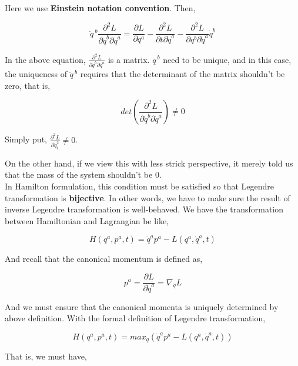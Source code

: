 \documentclass[12pt]{article}
\begin{document}
Here we use \textbf{Einstein notation convention}. Then,

\begin{center}
    \[ \ddot{q}^{\ b} \frac{\partial^2 L}{\partial \dot{q}^b \partial \dot{q}^a} = \frac{\partial L}{\partial q^a} - \frac{\partial^2 L}{\partial t \partial \dot{q}^a} - \frac{\partial^2 L}{\partial q^b \partial \dot{q}^a} \dot{q}^b \]
\end{center}

In the above equation, $\frac{\partial^2 L}{\partial \dot{q}^b \partial \dot{q}^a}$ is a matrix. $\ddot{q}^{\ b}$ need to be unique, and in this case, the uniqueness of $\ddot{q}^{\ b}$ requires that the determinant of the matrix shouldn't be zero, that is,

\begin{center}
    \[ det\left(\frac{\partial^2 L}{\partial \dot{q}^b \partial \dot{q}^a}\right) \ne 0\]
\end{center}

Simply put, $\frac{\partial^2 L}{\partial \dot{q}_i^2} \ne 0$.

On the other hand, if we view this with less strick perspective, it merely told us that the mass of the system shouldn't be $0$.
\\
\indent In Hamilton formulation, this condition must be satisfied so that Legendre transformation is \textbf{bijective}. In other words, we have to make sure the result of inverse Legendre transformation is well-behaved. We have the transformation between Hamiltonian and Lagrangian be like,

\begin{center}
    \[ H(q^a, p^a, t) = \dot{q}^ap^a - L(q^a, \dot{q}^a, t) \]
\end{center}

And recall that the canonical momentum is defined as,

\begin{center}
    \[ p^a = \frac{\partial L}{\partial \dot{q}^a} = \nabla_{\dot{q}} L \]
\end{center}

And we must ensure that the canonical momenta is uniquely determined by above definition. With the formal definition of Legendre transformation,

\begin{center}
    \[ H(q^a, p^a, t) = max_{\dot{q}} \left(\dot{q}^ap^a - L(q^a, \dot{q}^a, t)\right) \]
\end{center}

That is, we must have,
\end{document}
